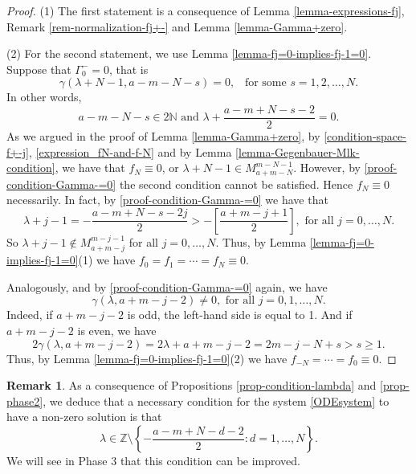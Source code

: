 \documentclass[12pt, pdflatex, a4paper]{article}
\theoremstyle{plain}
\theoremstyle{definition}
\newtheorem{rem}[thm]{Remark}
\def\N{{\mathbb N}}
\def\Z{{\mathbb Z}}
\begin{document}
\begin{proof}
(1) The first statement is a consequence of Lemma \ref{lemma-expressions-fj}, Remark \ref{rem-normalization-fj+-} and Lemma \ref{lemma-Gamma+zero}.

(2) For the second statement, we use Lemma \ref{lemma-fj=0-implies-fj-1=0}. Suppose that $\Gamma_0^- = 0$, that is
\begin{equation*}
\gamma(\lambda+N-1, a-m-N-s) = 0, \enspace \text{ for some } s = 1, 2, \ldots, N.
\end{equation*}
In other words,
\begin{equation}\label{proof-condition-Gamma-=0}
a-m-N-s \in 2\N \text{ and } \lambda+\frac{a-m+N-s-2}{2} = 0.
\end{equation}
As we argued in the proof of Lemma \ref{lemma-Gamma+zero}, by \eqref{condition-space-f+-j}, \eqref{expression_fN-and-f-N} and by Lemma \ref{lemma-Gegenbauer-Mlk-condition}, we have that $f_N \equiv 0$, or $\lambda+N-1 \in M_{a+m-N}^{m-N-1}$. However, by \eqref{proof-condition-Gamma-=0} the second condition cannot be satisfied. Hence $f_N \equiv 0$ necessarily. In fact, by \eqref{proof-condition-Gamma-=0} we have that
\begin{equation*}
\lambda+j-1 =-\frac{a-m+N-s-2j}{2} > -\left[\frac{a+m-j+1}{2}\right], \text{ for all } j = 0, \ldots, N.
\end{equation*}
So $\lambda+j-1 \notin M_{a+m-j}^{m-j-1}$ for all $j = 0, \ldots, N$. Thus, by Lemma \ref{lemma-fj=0-implies-fj-1=0}(1) we have $f_0 = f_1 = \cdots = f_N \equiv 0$.

Analogously, and by \eqref{proof-condition-Gamma-=0} again, we have
\begin{equation*}
\gamma(\lambda, a+m-j-2) \neq 0, \text{ for all } j=0, 1, \ldots, N.
\end{equation*}
Indeed, if $a+m-j-2$ is odd, the left-hand side is equal to 1. And if $a+m-j-2$ is even, we have
\begin{equation*}
2\gamma(\lambda, a+m-j-2) = 2\lambda + a+m-j-2 =
2m-j-N+s > s \geq 1.
\end{equation*}
Thus, by Lemma \ref{lemma-fj=0-implies-fj-1=0}(2) we have
$f_{-N} = \cdots = f_0 \equiv 0$.
\end{proof}

\begin{rem} As a consequence of Propositions \ref{prop-condition-lambda} and \ref{prop-phase2}, we deduce that a necessary condition for the system \eqref{ODEsystem} to have a non-zero solution is that
\begin{equation*}
\lambda \in \Z\setminus\left\{-\frac{a-m+N-d-2}{2}: d= 1, \ldots, N\right\}.
\end{equation*}
We will see in Phase 3 that this condition can be improved.
\end{rem}
\end{document}

